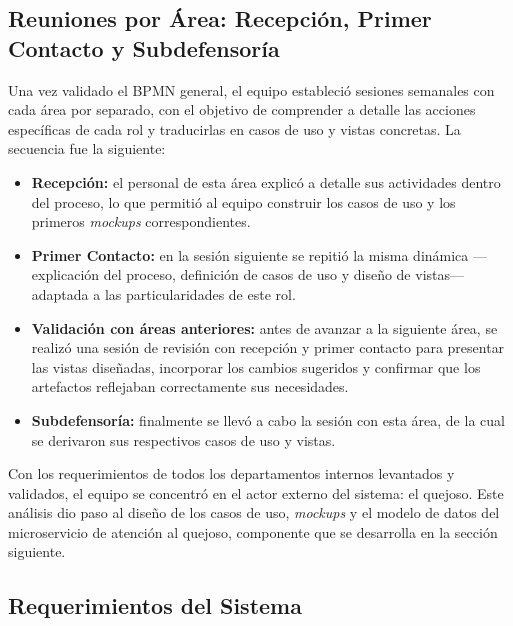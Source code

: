 \subsection{Reuniones por Área: Recepción, Primer Contacto y Subdefensoría}

Una vez validado el BPMN general, el equipo estableció sesiones semanales con 
cada área por separado, con el objetivo de comprender a detalle las acciones 
específicas de cada rol y traducirlas en casos de uso y vistas concretas. La 
secuencia fue la siguiente:

\begin{itemize}
    \item \textbf{Recepción:} el personal de esta área explicó a detalle sus 
    actividades dentro del proceso, lo que permitió al equipo construir los casos 
    de uso y los primeros \textit{mockups} correspondientes.

    \item \textbf{Primer Contacto:} en la sesión siguiente se repitió la misma 
    dinámica —explicación del proceso, definición de casos de uso y diseño de 
    vistas— adaptada a las particularidades de este rol.

    \item \textbf{Validación con áreas anteriores:} antes de avanzar a la 
    siguiente área, se realizó una sesión de revisión con recepción y primer 
    contacto para presentar las vistas diseñadas, incorporar los cambios sugeridos 
    y confirmar que los artefactos reflejaban correctamente sus necesidades.

    \item \textbf{Subdefensoría:} finalmente se llevó a cabo la sesión con esta 
    área, de la cual se derivaron sus respectivos casos de uso y vistas.
\end{itemize}

Con los requerimientos de todos los departamentos internos levantados y validados, 
el equipo se concentró en el actor externo del sistema: el quejoso. Este análisis 
dio paso al diseño de los casos de uso, \textit{mockups} y el modelo de datos 
del microservicio de atención al quejoso, componente que se desarrolla en la 
sección siguiente.

\subsection{Requerimientos del Sistema}
\label{subsec:requerimientos_sistema}

